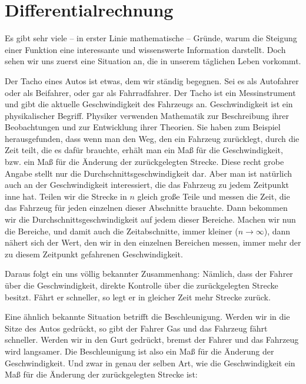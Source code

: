 

\chapter{Differentialrechnung}\label{chap:diff}

Es gibt sehr viele -- in erster Linie mathematische -- Gründe, warum die Steigung einer Funktion eine interessante und wissenswerte Information darstellt. Doch sehen wir uns zuerst eine Situation an, die in unserem täglichen Leben vorkommt.

Der Tacho eines Autos ist etwas, dem wir ständig begegnen. Sei es als Autofahrer oder als Beifahrer, oder gar als Fahrradfahrer. Der Tacho ist ein Messinstrument und gibt die aktuelle Geschwindigkeit des Fahrzeugs an. Geschwindigkeit ist ein physikalischer Begriff. Physiker verwenden Mathematik zur Beschreibung ihrer Beobachtungen und zur Entwicklung ihrer Theorien. Sie haben zum Beispiel herausgefunden, dass wenn man den Weg, den ein Fahrzeug zurücklegt, durch die Zeit teilt, die es dafür brauchte, erhält man ein Maß für die Geschwindigkeit, bzw. ein Maß für die Änderung der zurückgelegten Strecke. Diese recht grobe Angabe stellt nur die Durchschnittsgeschwindigkeit dar. Aber man ist natürlich auch an der Geschwindigkeit interessiert, die das Fahrzeug zu jedem Zeitpunkt inne hat. Teilen wir die Strecke in $n$ gleich große Teile und messen die Zeit, die das Fahrzeug für jeden einzelnen dieser Abschnitte brauchte. Dann bekommen wir die Durchschnittsgeschwindigkeit auf jedem dieser Bereiche. Machen wir nun die Bereiche, und damit auch die Zeitabschnitte, immer kleiner ($n \rightarrow \infty$), dann nähert sich der Wert, den wir in den einzelnen Bereichen messen, immer mehr der zu diesem Zeitpunkt gefahrenen Geschwindigkeit. 

Daraus folgt ein uns völlig bekannter Zusammenhang: Nämlich, dass der Fahrer über die Geschwindigkeit, direkte Kontrolle über die zurückgelegten Strecke besitzt. Fährt er schneller, so legt er in gleicher Zeit mehr Strecke zurück. 

Eine ähnlich bekannte Situation betrifft die Beschleunigung. Werden wir in die Sitze des Autos gedrückt, so gibt der Fahrer Gas und das Fahrzeug fährt schneller. Werden wir in den Gurt gedrückt, bremst der Fahrer und das Fahrzeug wird langsamer. Die Beschleunigung ist also ein Maß für die Änderung der Geschwindigkeit. Und zwar in genau der selben Art, wie die Geschwindigkeit ein Maß für die Änderung der zurückgelegten Strecke ist:

